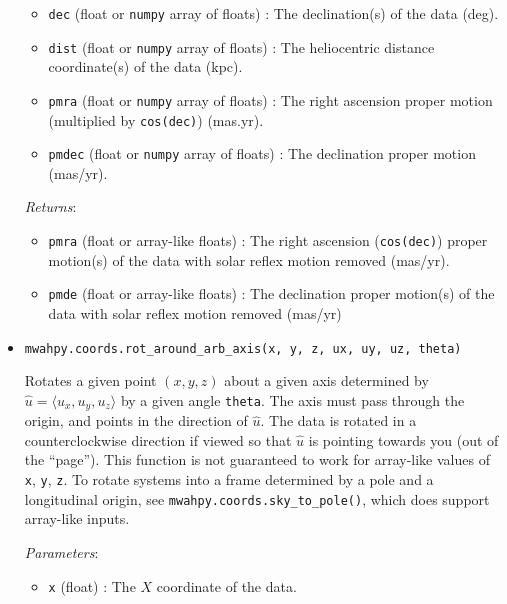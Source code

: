 \documentclass{article}
\begin{document}
\begin{itemize}
\begin{itemize}
\item \verb!dec! (float or \verb!numpy! array of floats) : The declination(s) of the data (deg).

\item \verb!dist! (float or \verb!numpy! array of floats) : The heliocentric distance coordinate(s) of the data (kpc).

\item \verb!pmra! (float or \verb!numpy! array of floats) : The right ascension proper motion (multiplied by \verb!cos(dec)!) (mas.yr). 

\item \verb!pmdec! (float or \verb!numpy! array of floats) : The declination proper motion (mas/yr). 

\end{itemize}

\textit{Returns}: \begin{itemize}

\item \verb!pmra! (float or array-like floats) : The right ascension (\verb!cos(dec)!) proper motion(s) of the data with solar reflex motion removed (mas/yr).

\item \verb!pmde! (float or array-like floats) : The declination proper motion(s) of the data with solar reflex motion removed (mas/yr)

\end{itemize}



\item \verb!mwahpy.coords.rot_around_arb_axis(x, y, z, ux, uy, uz, theta)!

Rotates a given point $(x,y,z)$ about a given axis determined by  $\hat{u} = \langle u_x, u_y, u_z \rangle$ by a given angle \verb!theta!. The axis must pass through the origin, and points in the direction of $\hat{u}$. The data is rotated in a counterclockwise direction if viewed so that $\hat{u}$ is pointing towards you (out of the ``page''). This function is not guaranteed to work for array-like values of \verb!x!, \verb!y!, \verb!z!. To rotate systems into a frame determined by a pole and a longitudinal origin, see \verb!mwahpy.coords.sky_to_pole()!, which does support array-like inputs.

\textit{Parameters}: \begin{itemize}

\item \verb!x! (float) : The $X$ coordinate of the data.


\end{itemize}
\end{itemize}
\end{document}
